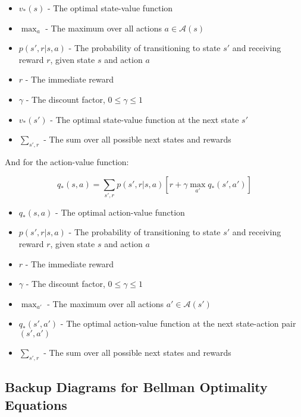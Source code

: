 \documentclass[12pt,a4paper]{article}
\begin{document}
\begin{tcolorbox}[title=Notation Overview]
\begin{itemize}
    \item $v_*(s)$ - The optimal state-value function
    \item $\max_a$ - The maximum over all actions $a \in \mathcal{A}(s)$
    \item $p(s',r|s,a)$ - The probability of transitioning to state $s'$ and receiving reward $r$, given state $s$ and action $a$
    \item $r$ - The immediate reward
    \item $\gamma$ - The discount factor, $0 \leq \gamma \leq 1$
    \item $v_*(s')$ - The optimal state-value function at the next state $s'$
    \item $\sum_{s',r}$ - The sum over all possible next states and rewards
\end{itemize}
\end{tcolorbox}

And for the action-value function:

\begin{equation}
q_*(s,a) = \sum_{s',r} p(s',r|s,a) [r + \gamma \max_{a'} q_*(s',a')]
\end{equation}

\begin{tcolorbox}[title=Notation Overview]
\begin{itemize}
    \item $q_*(s,a)$ - The optimal action-value function
    \item $p(s',r|s,a)$ - The probability of transitioning to state $s'$ and receiving reward $r$, given state $s$ and action $a$
    \item $r$ - The immediate reward
    \item $\gamma$ - The discount factor, $0 \leq \gamma \leq 1$
    \item $\max_{a'}$ - The maximum over all actions $a' \in \mathcal{A}(s')$
    \item $q_*(s',a')$ - The optimal action-value function at the next state-action pair $(s', a')$
    \item $\sum_{s',r}$ - The sum over all possible next states and rewards
\end{itemize}
\end{tcolorbox}

\subsection{Backup Diagrams for Bellman Optimality Equations}
\end{document}
